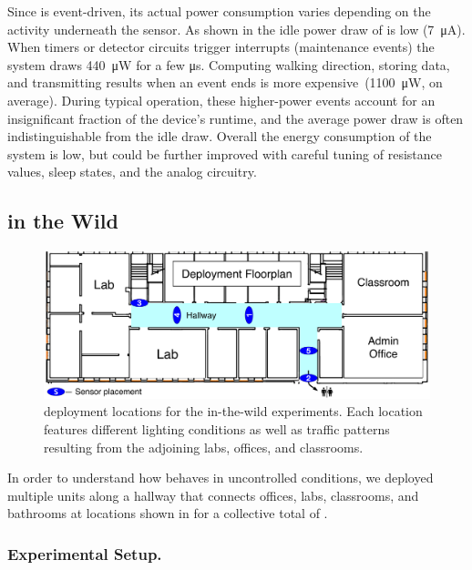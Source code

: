 Since \sysname is event-driven, its actual power consumption varies depending on the activity underneath the sensor. As shown in  the idle power draw of \sysname is low (\SI{7}{\micro\ampere}). When timers or detector circuits trigger interrupts (maintenance events) the system draws \SI{440}{\micro\watt} for a few \si{\micro\second}.
Computing walking direction, storing data, and transmitting results when an event ends is more expensive~(\SI{1100}{\micro\watt}, on average).
During typical operation, these higher-power events account for an insignificant fraction of the device's runtime, and the average power draw is often indistinguishable from the idle draw.
Overall the energy consumption of the system is low, but could be further improved with careful tuning of resistance values, sleep states, and the analog circuitry.







\subsection{\sysnames in the Wild}


\begin{figure}[t]
\centering
\includegraphics[width=\columnwidth]{figs/floorplan.pdf}
\caption{\sysname deployment locations for the in-the-wild experiments. Each location features different lighting conditions as well as traffic patterns resulting from the adjoining labs, offices, and classrooms. \label{fig:floorplan}}
\end{figure}


In order to understand how \sysname behaves in uncontrolled conditions, we deployed multiple \sysname units along a hallway that connects offices, labs, classrooms, and bathrooms at locations shown in  for a collective total of \ITWdays.  


\subsubsection{Experimental Setup.}

